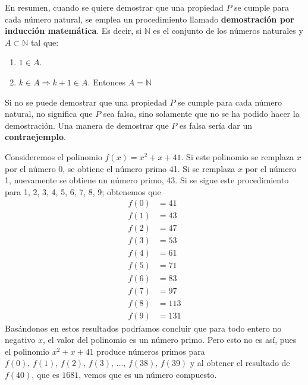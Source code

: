 \begin{BOX}
    En resumen, cuando se quiere demostrar que una propiedad $P$ se cumple para cada número natural, se emplea un procedimiento llamado \textbf{demostración por inducción matemática}. Es decir, si $\mathbb{N}$ es el conjunto de los números naturales y $A \subset \mathbb{N}$ tal que:
    \begin{enumerate}[label=\roman*)]
        \item $1 \in A$.
        \item $k \in A \Longrightarrow k+1 \in A$. Entonces $A=\mathbb{N}$
    \end{enumerate}
\end{BOX}

\begin{importante}
    Si no se puede demostrar que una propiedad $P$ se cumple para cada número natural, no significa que $P$ sea falsa, sino solamente que no se ha podido hacer la demostración. Una manera de demostrar que $P$ es falsa sería dar un \textbf{contraejemplo}.
\end{importante}

\begin{myexample}
    Consideremos el polinomio $f(x)=x^2+x+41$. Si este polinomio se remplaza $x$ por el número 0, se obtiene el número primo 41. Si se remplaza $x$ por el número 1, nuevamente se obtiene un número primo, 43. Si se sigue este procedimiento para 1, 2, 3, 4, 5, 6, 7, 8, 9; obtenemos que
    \begin{align*}
        f(0) &=41 \\
        f(1) &=43 \\
        f(2) &=47 \\
        f(3) &=53 \\
        f(4) &=61 \\
        f(5) &=71 \\
        f(6) &=83 \\
        f(7) &=97 \\
        f(8) &=113 \\
        f(9) &=131
    \end{align*}
    Basándonos en estos resultados podríamos concluir que para todo entero no negativo $x$, el valor del polinomio es un número primo. Pero esto no es así, pues el polinomio $x^2+x+41$ produce números primos para $f(0), \, f(1), \, f(2), \, f(3), \, \dots, \, f(38), \, f(39)$ y al obtener el resultado de $f(40)$, que es $1681$, vemos que es un número compuesto.
\end{myexample}


